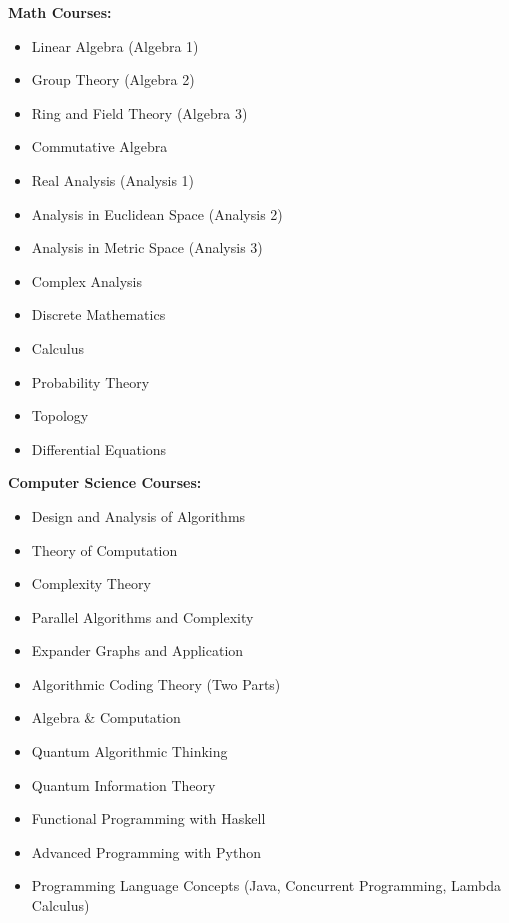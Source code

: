 \documentclass[a4paper,skipsamekey,11pt,english]{curve}
\begin{document}
\begin{itemize}
	      \textbf{Math Courses:}{}
	      \begin{multicols}{2}
		      \begin{itemize}
			      \item Linear Algebra (Algebra 1)
			      \item Group Theory (Algebra 2)
			      \item Ring and  Field Theory (Algebra 3)
			      \item Commutative Algebra
			      \item Real Analysis (Analysis 1)
			      \item Analysis in Euclidean Space (Analysis 2)
			      \item Analysis in Metric Space (Analysis 3) \columnbreak
			      \item Complex Analysis
			      \item Discrete Mathematics
			      \item Calculus
			      \item Probability Theory
			      \item Topology
			      \item Differential Equations
		      \end{itemize}
	      \end{multicols}
	      \textbf{Computer Science Courses:}{}
		  \begin{multicols}{2}
	      \begin{itemize}
		      \item Design and Analysis of Algorithms
		      \item Theory of Computation
		      \item Complexity Theory
		      \item Parallel Algorithms and Complexity
		      \item Expander Graphs and Application
		      \item Algorithmic Coding Theory (Two Parts)
		      \item Algebra \& Computation
		      \item Quantum Algorithmic Thinking
		      \item Quantum Information Theory
		      \item Functional Programming with Haskell
		      \item Advanced Programming with Python
		      \item Programming Language Concepts (Java, Concurrent Programming, Lambda Calculus)
	      \end{itemize}
		  	\end{multicols}
\end{itemize}
% 
\end{document}
